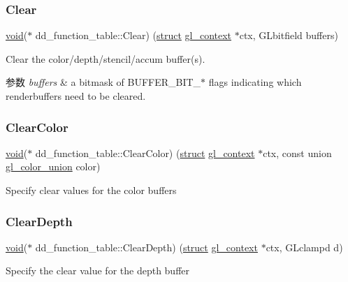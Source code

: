 \subsubsection{\texorpdfstring{Clear}{Clear}}
{\footnotesize\ttfamily \hyperlink{interfacevoid}{void}($\ast$ dd\+\_\+function\+\_\+table\+::\+Clear) (\hyperlink{interfacestruct}{struct} \hyperlink{structgl__context}{gl\+\_\+context} $\ast$ctx, G\+Lbitfield buffers)}

Clear the color/depth/stencil/accum buffer(s). 
\begin{DoxyParams}{参数}
{\em buffers} & a bitmask of B\+U\+F\+F\+E\+R\+\_\+\+B\+I\+T\+\_\+$\ast$ flags indicating which renderbuffers need to be cleared. \\
\hline
\end{DoxyParams}
\mbox{\label{structdd__function__table_ace26dc0dbb18a0787f792fa5144e739a}} 
\subsubsection{\texorpdfstring{Clear\+Color}{ClearColor}}
{\footnotesize\ttfamily \hyperlink{interfacevoid}{void}($\ast$ dd\+\_\+function\+\_\+table\+::\+Clear\+Color) (\hyperlink{interfacestruct}{struct} \hyperlink{structgl__context}{gl\+\_\+context} $\ast$ctx, const union \hyperlink{uniongl__color__union}{gl\+\_\+color\+\_\+union} color)}

Specify clear values for the color buffers \mbox{\label{structdd__function__table_a42f995056022b65949c0021e1d0f5c35}} 
\subsubsection{\texorpdfstring{Clear\+Depth}{ClearDepth}}
{\footnotesize\ttfamily \hyperlink{interfacevoid}{void}($\ast$ dd\+\_\+function\+\_\+table\+::\+Clear\+Depth) (\hyperlink{interfacestruct}{struct} \hyperlink{structgl__context}{gl\+\_\+context} $\ast$ctx, G\+Lclampd d)}

Specify the clear value for the depth buffer \mbox{\label{structdd__function__table_ae1cc680b898261ec9a25547884009527}} 
